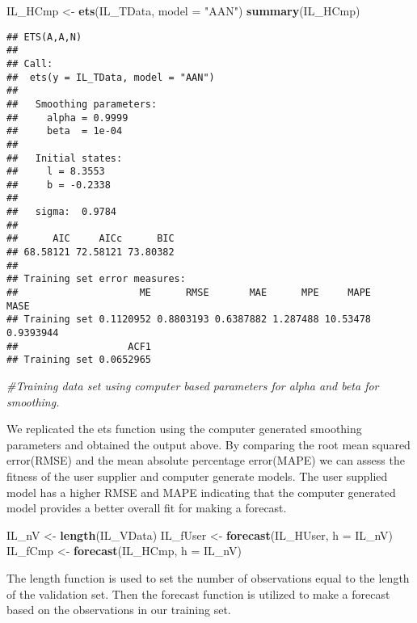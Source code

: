 \documentclass[
]{article}
\newenvironment{Shaded}{\begin{snugshade}}{\end{snugshade}}
\newcommand{\CommentTok}[1]{\textcolor[rgb]{0.56,0.35,0.01}{\textit{#1}}}
\newcommand{\DataTypeTok}[1]{\textcolor[rgb]{0.13,0.29,0.53}{#1}}
\newcommand{\KeywordTok}[1]{\textcolor[rgb]{0.13,0.29,0.53}{\textbf{#1}}}
\newcommand{\NormalTok}[1]{#1}
\newcommand{\StringTok}[1]{\textcolor[rgb]{0.31,0.60,0.02}{#1}}
\begin{document}
\begin{Shaded}
\begin{Highlighting}[]
\NormalTok{IL_HCmp <-}\StringTok{ }\KeywordTok{ets}\NormalTok{(IL_TData, }\DataTypeTok{model =} \StringTok{"AAN"}\NormalTok{)}
\KeywordTok{summary}\NormalTok{(IL_HCmp)}
\end{Highlighting}
\end{Shaded}

\begin{verbatim}
## ETS(A,A,N) 
## 
## Call:
##  ets(y = IL_TData, model = "AAN") 
## 
##   Smoothing parameters:
##     alpha = 0.9999 
##     beta  = 1e-04 
## 
##   Initial states:
##     l = 8.3553 
##     b = -0.2338 
## 
##   sigma:  0.9784
## 
##      AIC     AICc      BIC 
## 68.58121 72.58121 73.80382 
## 
## Training set error measures:
##                     ME      RMSE       MAE      MPE     MAPE      MASE
## Training set 0.1120952 0.8803193 0.6387882 1.287488 10.53478 0.9393944
##                   ACF1
## Training set 0.0652965
\end{verbatim}

\begin{Shaded}
\begin{Highlighting}[]
\CommentTok{#Training data set using computer based parameters for alpha and beta for smoothing.}
\end{Highlighting}
\end{Shaded}

We replicated the ets function using the computer generated smoothing
parameters and obtained the output above. By comparing the root mean
squared error(RMSE) and the mean absolute percentage error(MAPE) we can
assess the fitness of the user supplier and computer generate models.
The user supplied model has a higher RMSE and MAPE indicating that the
computer generated model provides a better overall fit for making a
forecast.

\begin{Shaded}
\begin{Highlighting}[]
\NormalTok{IL_nV <-}\StringTok{ }\KeywordTok{length}\NormalTok{(IL_VData)}
\NormalTok{IL_fUser <-}\StringTok{ }\KeywordTok{forecast}\NormalTok{(IL_HUser, }\DataTypeTok{h =}\NormalTok{ IL_nV)}
\NormalTok{IL_fCmp <-}\StringTok{ }\KeywordTok{forecast}\NormalTok{(IL_HCmp, }\DataTypeTok{h =}\NormalTok{ IL_nV)}
\end{Highlighting}
\end{Shaded}

The length function is used to set the number of observations equal to
the length of the validation set. Then the forecast function is utilized
to make a forecast based on the observations in our training set.
\end{document}
